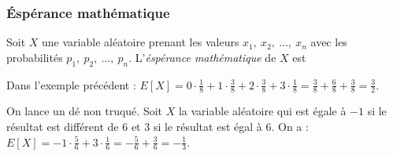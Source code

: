                         \subsubsection{\'Esp\'erance math\'ematique}
                              Soit $X$ une variable al\'eatoire prenant les valeurs 
                              $x_1,\ x_2,\ \ldots ,\ x_n$ avec les probabilit\'es 
                              $p_1,\ p_2,\ \ldots ,\ p_n$.
                              L'\emph{\'esp\'erance math\'ematique} de $X$ est
                              \par\smallskip\noindent
                              \par\smallskip
                              \begin{ex}
                                    Dans l'exemple pr\'ec\'edent :
                                    $E[X] =  0 \cdot \frac{1}{8}
                                           + 1 \cdot \frac{3}{8}
                                           + 2 \cdot \frac{3}{8}
                                           + 3 \cdot \frac{1}{8}
                                          = \frac{3}{8} + \frac{6}{8} + \frac{3}{8}
                                          = \frac{3}{2}.
                                    $
                              \end{ex}
                              \begin{ex}
                                    On lance un d\'e non truqu\'e.
                                    Soit $X$ la variable al\'eatoire qui est \'egale \`a $-1$
                                    si le r\'esultat est diff\'erent de $6$
                                    et $3$ si le r\'esultat est \'egal \`a $6$.
                                    On a :
                                    $E[X] = -1 \cdot \frac{5}{6} + 3 \cdot \frac{1}{6}
                                          = -\frac{5}{6} + \frac{3}{6}
                                          = -\frac{1}{3}.
                                    $
                              \end{ex}
